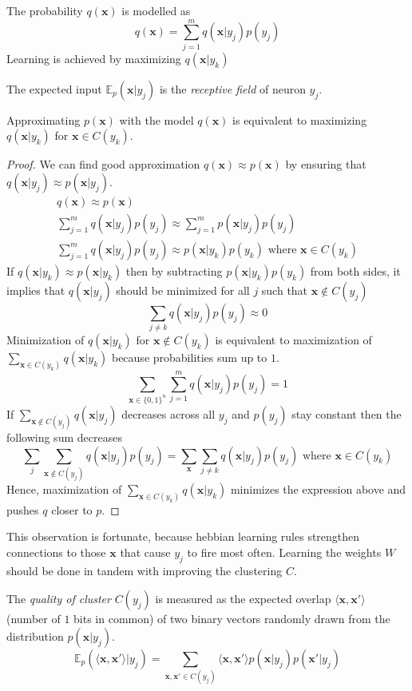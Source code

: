 \documentclass[oneside,english,logo]{amuthesis}
\begin{document}
The probability $q(\boldsymbol{x})$ is modelled as
\[
q(\boldsymbol{x}) = \sum_{j=1}^{m} q(\boldsymbol{x}|y_j)p(y_j)
\]
Learning is achieved by maximizing $q(\boldsymbol{x}|y_k)$
\begin{definition}
The expected input $\mathbb{E}_p(\boldsymbol{x}|y_j)$ is the \textit{receptive field} of neuron $y_j$.
\end{definition}
\begin{theorem}
Approximating $p(\boldsymbol{x})$ with the model $q(\boldsymbol{x})$ is equivalent to maximizing $q(\boldsymbol{x}|y_k)$ for $\boldsymbol{x}\in C(y_k)$. 
\end{theorem}
\begin{proof}
We can find good approximation $q(\boldsymbol{x})\approx p(\boldsymbol{x})$ by ensuring that $q(\boldsymbol{x}|y_j)\approx p(\boldsymbol{x}|y_j)$. 
\begin{gather*}
	q(\boldsymbol{x}) \approx p(\boldsymbol{x}) \\
	\sum_{j=1}^{m} q(\boldsymbol{x}|y_j)p(y_j) \approx \sum_{j=1}^{m} p(\boldsymbol{x}|y_j)p(y_j) \\
	\sum_{j=1}^{m} q(\boldsymbol{x}|y_j)p(y_j)  \approx p(\boldsymbol{x}|y_k)p(y_k) \text{ where }\boldsymbol{x}\in C(y_k)
\end{gather*}
If $q(\boldsymbol{x}|y_k)\approx p(\boldsymbol{x}|y_k)$ then by subtracting $p(\boldsymbol{x}|y_k)p(y_k)$ from both sides, it implies that $ q(\boldsymbol{x}|y_j)$ should be minimized for all $j$ such that $\boldsymbol{x}\notin C(y_j)$
\[
	\sum_{j\ne k} q(\boldsymbol{x}|y_j)p(y_j) \approx 0 
\]
Minimization of $q(\boldsymbol{x}|y_k)$ for $\boldsymbol{x}\notin C(y_k)$ is equivalent to maximization of $\sum_{\boldsymbol{x}\in C(y_k)}q(\boldsymbol{x}|y_k)$ because probabilities sum up to $1$. 
\[
\sum_{\boldsymbol{x}\in\{0,1\}^n} \sum_{j=1}^{m} q(\boldsymbol{x}|y_j)p(y_j) = 1
\]
If $\sum_{\boldsymbol{x}\notin C(y_j)} q(\boldsymbol{x}|y_j)$ decreases across all $y_j$ and $p(y_j)$ stay constant then the following sum decreases
\[
\sum_{j} \sum_{\boldsymbol{x}\notin C(y_j)} q(\boldsymbol{x}|y_j) p(y_j) = \sum_{\boldsymbol{x}} \sum_{j\ne k}  q(\boldsymbol{x}|y_j) p(y_j) \text{ where }\boldsymbol{x}\in C(y_k)
\]
Hence, maximization of $\sum_{\boldsymbol{x}\in C(y_k)}q(\boldsymbol{x}|y_k)$ minimizes the expression above and pushes $q$ closer to $p$.
\end{proof}
This observation is fortunate, because hebbian learning rules strengthen connections to those $\boldsymbol{x}$ that cause $y_j$ to fire most often. Learning the weights $W$ should be done in tandem with improving the clustering $C$.
\begin{definition}
The \textit{quality of cluster} $C(y_j)$ is measured as the expected overlap $\langle \boldsymbol{x}, \boldsymbol{x}'\rangle$ (number of $1$ bits in common) of two binary vectors  randomly drawn from the distribution $p(\boldsymbol{x}|y_j)$.
\[
	\mathbb{E}_p(\langle \boldsymbol{x}, \boldsymbol{x}'\rangle|y_j) = \sum_{\boldsymbol{x},\boldsymbol{x}'\in C(y_j)} \langle \boldsymbol{x}, \boldsymbol{x}'\rangle p(\boldsymbol{x}|y_j)p(\boldsymbol{x}'|y_j)
\]
\end{definition}	
\end{document}
